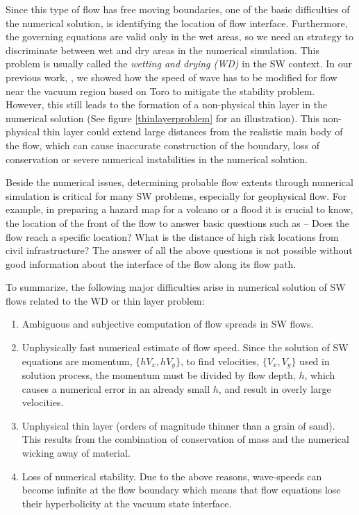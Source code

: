 \documentclass[letterpaper,10pt]{article}
\begin{document}
Since this type of flow has free moving boundaries, one of the basic difficulties 
of the numerical solution, is identifying the location of flow interface. 
Furthermore, the governing equations are  valid only in the wet areas, so we need an strategy to discriminate between wet and dry areas in the numerical simulation. 
This problem is usually called the {\it wetting and drying (WD)} %
in  the SW context. In our previous work, \cite{Patra2005}, we showed how the speed of wave has to be modified for flow near the vacuum region based on Toro \cite{ToroBook2001} to mitigate the stability problem. However,  this still leads to the formation of a non-physical thin layer in the numerical solution (See figure \ref{thinlayerproblem} for an illustration).
This non-physical thin layer could extend large distances from the realistic main 
body of the flow, which can cause inaccurate construction of the boundary, loss of conservation or severe 
numerical instabilities in the numerical solution. 

Beside the numerical issues, determining probable flow extents through numerical simulation is critical for many SW problems, especially for geophysical flow. For example, in preparing a hazard map for a volcano or a flood it is crucial to know, the location of the front of the flow to answer basic questions such as --  Does the flow reach  a specific location? What is the distance of high 
risk locations from civil infrastructure? 
The answer of all the above questions is not possible without good information about the interface of the flow along its flow path.

To summarize, the following major difficulties  arise in numerical solution of SW flows related to the WD or thin layer problem:

\begin{enumerate}
\item Ambiguous and subjective computation of flow spreads in SW flows.
\item \label{problemwicking}
     Unphysically fast numerical  estimate of flow speed.      Since the solution of SW equations are momentum, $\{hV_x,hV_y\}$, to find velocities, $\{V_x,V_y\}$ used in solution process, the momentum must be divided by flow depth, $h$, which causes a numerical error in an already small $h$, and result in overly large velocities.
\item \label{problemtoothin}
      Unphysical thin layer (orders of magnitude thinner than a grain of sand). This results from the combination of conservation of mass and the numerical wicking away of material.

\item \label{problemunstable}
      Loss of numerical stability.  Due to the above reasons, wave-speeds can become infinite at the flow boundary which means that flow equations lose their hyperbolicity  at the vacuum state interface.
\end{enumerate}\label{thinprob}
\end{document}

